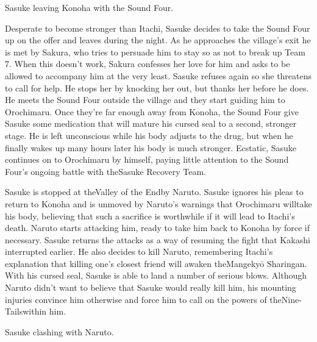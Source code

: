 \documentclass[a4paper,12pt]{article}
\begin{document}
Sasuke leaving Konoha with the Sound Four.\\ \par \vspace{0.5cm}

Desperate to become stronger than Itachi, Sasuke decides to take the Sound Four up on the offer and leaves during the night. As he approaches the village's exit he is met by Sakura, who tries to persuade him to stay so as not to break up Team 7. When this doesn't work, Sakura confesses her love for him and asks to be allowed to accompany him at the very least. Sasuke refuses again so she threatens to call for help. He stops her by knocking her out, but thanks her before he does. He meets the Sound Four outside the village and they start guiding him to Orochimaru. Once they're far enough away from Konoha, the Sound Four give Sasuke some medication that will mature his cursed seal to a second, stronger stage. He is left unconscious while his body adjusts to the drug, but when he finally wakes up many hours later his body is much stronger. Ecstatic, Sasuke continues on to Orochimaru by himself, paying little attention to the Sound Four's ongoing battle with theSasuke Recovery Team.\\ \par \vspace{0.5cm}

Sasuke is stopped at theValley of the Endby Naruto. Sasuke ignores his pleas to return to Konoha and is unmoved by Naruto's warnings that Orochimaru willtake his body, believing that such a sacrifice is worthwhile if it will lead to Itachi's death. Naruto starts attacking him, ready to take him back to Konoha by force if necessary. Sasuke returns the attacks as a way of resuming the fight that Kakashi interrupted earlier. He also decides to kill Naruto, remembering Itachi's explanation that killing one's closest friend will awaken theMangekyō Sharingan. With his cursed seal, Sasuke is able to land a number of serious blows. Although Naruto didn't want to believe that Sasuke would really kill him, his mounting injuries convince him otherwise and force him to call on the powers of theNine-Tailswithin him.\\ \par \vspace{0.5cm}

Sasuke clashing with Naruto.\\ \par \vspace{0.5cm}
\end{document}
